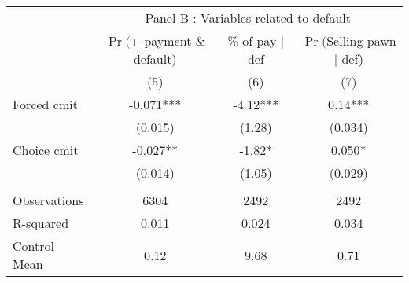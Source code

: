 \begin{tabular}{lccc}
\toprule
      & \multicolumn{3}{c}{Panel B  : Variables related to default} \\
\cmidrule{2-4}      & $\Pr($+ payment \& default) & \% of pay $|$ def  & $\Pr($Selling pawn $|$ def) \\
\midrule
\midrule
      & (5)   & (6)   & (7) \\
\midrule
\midrule
Forced cmit & -0.071*** & -4.12*** & 0.14*** \\
      & (0.015) & (1.28) & (0.034) \\
Choice cmit & -0.027** & -1.82* & 0.050* \\
      & (0.014) & (1.05) & (0.029) \\
      &       &       &  \\
\midrule
Observations & 6304  & 2492  & 2492 \\
R-squared & 0.011 & 0.024 & 0.034 \\
Control Mean & 0.12  & 9.68  & 0.71 \\
\bottomrule
\bottomrule
\end{tabular}%
